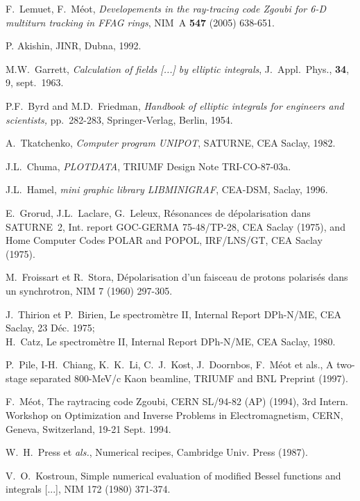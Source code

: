 \begin{thebibliography}{99}
 F.~Lemuet, F.~M\'eot, \textsl{Developements in the ray-tracing code Zgoubi for 
6-D multiturn tracking in FFAG rings}, NIM~A \textbf{547} (2005) 638-651. 

 P. Akishin, JINR, Dubna, 1992.


\newpage

 M.W.~Garrett, \textsl{Calculation of
fields  [...] by elliptic integrals}, J.~Appl.~Phys., \textbf{34}, 9, sept.~1963.  

 P.F.~Byrd and M.D.~Friedman, \textsl{Handbook of elliptic integrals 
for engineers and scientists,} pp.~282-283, Springer-Verlag, Berlin, 1954.  

 A.~Tkatchenko, \textsl{Computer program UNIPOT}, SATURNE, CEA Saclay, 1982. 

 J.L.~Chuma, \textsl{PLOTDATA}, TRIUMF Design Note TRI-CO-87-03a.

 J.L.~Hamel, \textsl{mini graphic library LIBMINIGRAF}, CEA-DSM, Saclay, 1996.

 E.~Grorud, J.L.~Laclare, G.~Leleux, R\'esonances de d\'epolarisation dans SATURNE~2, 
Int. report GOC-GERMA 75-48/TP-28, CEA Saclay (1975), 
and Home Computer Codes POLAR and POPOL, IRF/LNS/GT, CEA Saclay (1975).

 M.~Froissart et R.~Stora, D\'epolarisation d'un faisceau de 
protons polaris\'es dans un synchrotron, NIM 7 (1960) 297-305.

 J.~Thirion et P.~Birien, Le spectrom\`etre II, Internal Report DPh-N/ME, 
CEA Saclay, 23 D\'ec. 1975; \\
H.~Catz, Le spectrom\`etre II, Internal Report DPh-N/ME, CEA Saclay, 1980. 

  P.~Pile, I-H.~Chiang, K.~K.~Li, C.~J.~Kost, J.~Doornbos, F.~M\'eot et als., 
A two-stage separated 800-MeV/c Kaon beamline,  TRIUMF and BNL Preprint (1997).

 F.~M\'eot, 
The raytracing code Zgoubi, CERN SL/94-82 (AP) (1994), 
3rd Intern. Workshop on Optimization and Inverse Problems 
in Electromagnetism, CERN, Geneva, Switzerland, 19-21 Sept. 1994. 

 W.~H.~Press et {\it als.}, Numerical recipes, Cambridge Univ. Press (1987).  

 V.~O.~Kostroun, Simple numerical evaluation of modified Bessel functions 
and integrals [...], NIM 172 (1980) 371-374. 

\end{thebibliography}

